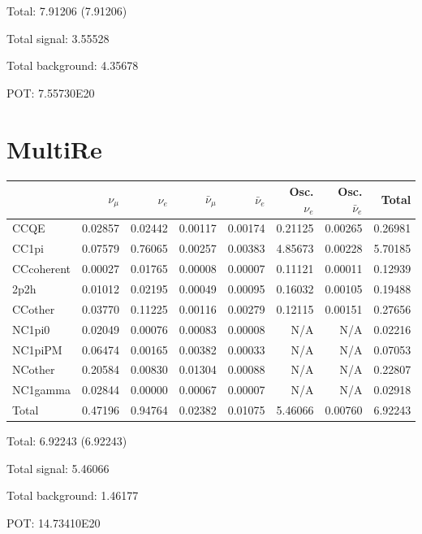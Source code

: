 \documentclass[10pt,a4paper]{article}
\begin{document}
Total: 7.91206    (7.91206)


Total signal: 3.55528


Total background: 4.35678

POT: 7.55730E20



\clearpage


\section*{MultiRe}
\begin{tabular} { | l ||r | r | r | r | r | r | | r | }
\hline
              & $\nu_\mu$            & $\nu_e$              & $\bar{\nu}_{\mu}$    & $\bar{\nu}_{e}$      & Osc. $\nu_e$         & Osc. $\bar{\nu}_{e}$ & Total                \\ \hline\hline
 CCQE         & 0.02857              & 0.02442              & 0.00117              & 0.00174              & 0.21125              & 0.00265              & 0.26981              \\ \hline
 CC1pi        & 0.07579              & 0.76065              & 0.00257              & 0.00383              & 4.85673              & 0.00228              & 5.70185              \\ \hline
 CCcoherent   & 0.00027              & 0.01765              & 0.00008              & 0.00007              & 0.11121              & 0.00011              & 0.12939              \\ \hline
 2p2h         & 0.01012              & 0.02195              & 0.00049              & 0.00095              & 0.16032              & 0.00105              & 0.19488              \\ \hline
 CCother      & 0.03770              & 0.11225              & 0.00116              & 0.00279              & 0.12115              & 0.00151              & 0.27656              \\ \hline
 NC1pi0       & 0.02049              & 0.00076              & 0.00083              & 0.00008              & N/A                  & N/A                  & 0.02216              \\ \hline
 NC1piPM      & 0.06474              & 0.00165              & 0.00382              & 0.00033              & N/A                  & N/A                  & 0.07053              \\ \hline
 NCother      & 0.20584              & 0.00830              & 0.01304              & 0.00088              & N/A                  & N/A                  & 0.22807              \\ \hline
 NC1gamma     & 0.02844              & 0.00000              & 0.00067              & 0.00007              & N/A                  & N/A                  & 0.02918              \\ \hline
\hline
 Total        & 0.47196              & 0.94764              & 0.02382              & 0.01075              & 5.46066              & 0.00760              & 6.92243              \\ \hline

\end{tabular}

Total: 6.92243    (6.92243)


Total signal: 5.46066


Total background: 1.46177

POT: 14.73410E20
\end{document}
